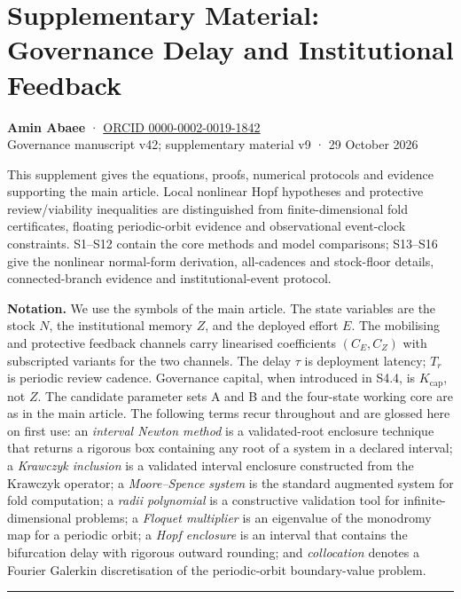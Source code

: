 \documentclass[
  10pt,
  a4paper,
]{article}
\author{}
\date{}
\begin{document}
\section{Supplementary Material: Governance Delay and Institutional
Feedback}\label{supplementary-material-governance-delay-and-institutional-feedback}

\textbf{Amin Abaee} · \href{https://orcid.org/0000-0002-0019-1842}{ORCID
0000-0002-0019-1842}\\
Governance manuscript v42; supplementary material v9 · 29 October 2026

This supplement gives the equations, proofs, numerical protocols and
evidence supporting the main article. Local nonlinear Hopf hypotheses
and protective review/viability inequalities are distinguished from
finite-dimensional fold certificates, floating periodic-orbit evidence
and observational event-clock constraints. S1--S12 contain the core
methods and model comparisons; S13--S16 give the nonlinear normal-form
derivation, all-cadences and stock-floor details, connected-branch
evidence and institutional-event protocol.

\textbf{Notation.} We use the symbols of the main article. The state
variables are the stock \(N\), the institutional memory \(Z\), and the
deployed effort \(E\). The mobilising and protective feedback channels
carry linearised coefficients \((C_E, C_Z)\) with subscripted variants
for the two channels. The delay \(\tau\) is deployment latency; \(T_r\)
is periodic review cadence. Governance capital, when introduced in S4.4,
is \(K_{\mathrm{cap}}\), not \(Z\). The candidate parameter sets A and B
and the four-state working core are as in the main article. The
following terms recur throughout and are glossed here on first use: an
\emph{interval Newton method} is a validated-root enclosure technique
that returns a rigorous box containing any root of a system in a
declared interval; a \emph{Krawczyk inclusion} is a validated interval
enclosure constructed from the Krawczyk operator; a \emph{Moore--Spence
system} is the standard augmented system for fold computation; a
\emph{radii polynomial} is a constructive validation tool for
infinite-dimensional problems; a \emph{Floquet multiplier} is an
eigenvalue of the monodromy map for a periodic orbit; a \emph{Hopf
enclosure} is an interval that contains the bifurcation delay with
rigorous outward rounding; and \emph{collocation} denotes a Fourier
Galerkin discretisation of the periodic-orbit boundary-value problem.

\begin{center}\rule{0.5\linewidth}{0.5pt}\end{center}
\end{document}
